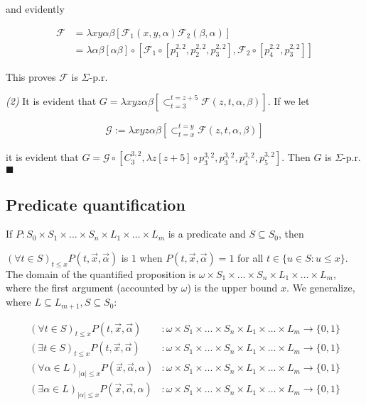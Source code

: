 \documentclass[a4paper, 12pt]{article}
\begin{document}
and evidently 

\begin{align*}
    \mathcal{F} &= \lambda xy\alpha\beta [\mathcal{F}_1(x, y, \alpha)
    \mathcal{F}_2(\beta, \alpha)]\\ &= \lambda \alpha\beta [\alpha\beta] \circ \left[
\mathcal{F}_1 \circ \left[ p_1^{2, 2}, p_2^{2, 2}, p_3^{2, 2} \right],
\mathcal{F}_2 \circ \left[ p_4^{2, 2}, p_3^{2, 2} \right]   \right]
\end{align*}

This proves $\mathcal{F}$ is $\Sigma$-p.r. 

\textit{(2)} It is evident that $G = \lambda xyz \alpha \beta
\left[\mathop{\subset}_{t=3}^{t=z+5} \mathcal{F}(z,
t, \alpha, \beta )\right]$. If we let 

\begin{align*}
    \mathcal{G} := \lambda xyz \alpha\beta \left[ \mathop{\subset}_{t=x}^{t=y}
    \mathcal{F} (z, t, \alpha, \beta)\right] 
\end{align*}

it is evident that $G = \mathcal{G} \circ \left[ C_{3}^{3, 2}, \lambda z [z + 5]
    \circ p_3^{3, 2},
p_3^{3, 2}, p_4^{3, 2}, p_5^{3, 2} \right] $. Then $G$ is $\Sigma$-p.r. $\blacksquare$

\subsection{Predicate quantification}

If $P : S_0 \times S_1 \times \ldots \times S_n \times L_1 \times \ldots \times
L_m $ is a predicate and $S \subseteq S_0$, then 

$(\forall t \in S)_{t \leq x}P(t, \overrightarrow{x}, \overrightarrow{\alpha})$ is $1$ when $P(t,
\overrightarrow{x}, \overrightarrow{\alpha}) = 1$ for all $t \in \{u \in S: u
\leq x\}$. The domain of the quantified proposition is $\omega \times S_1 \times
\ldots \times S_n \times L_1 \times \ldots \times L_m $, where the first
argument (accounted by $\omega$) is the upper bound $x$. We generalize, where $L
\subseteq L_{m+1}, S \subseteq S_0$:


\begin{align*}
    (\forall t \in S)_{t \leq x}P(t, \overrightarrow{x},
    \overrightarrow{\alpha})  
    &: \omega \times S_1 \times \ldots \times S_n \times L_1 \times \ldots \times L_m \to \{0, 1\}\\ 
    (\exists t \in S)_{t \leq x}P(t, \overrightarrow{x},
    \overrightarrow{\alpha}) 
    &: \omega \times S_1 \times \ldots \times S_n \times L_1 \times \ldots \times L_m \to \{0, 1\}\\ 
    (\forall \alpha \in L)_{|\alpha| \leq x}P(\overrightarrow{x},
    \overrightarrow{\alpha}, \alpha) 
    &: \omega \times S_1 \times \ldots \times S_n \times L_1 \times \ldots \times L_m \to \{0, 1\}\\ 
    (\exists \alpha \in L)_{|\alpha| \leq x}P(\overrightarrow{x},
    \overrightarrow{\alpha}, \alpha) 
    &: \omega \times S_1 \times \ldots \times S_n \times L_1 \times \ldots \times L_m \to \{0, 1\}
\end{align*}
\end{document}
